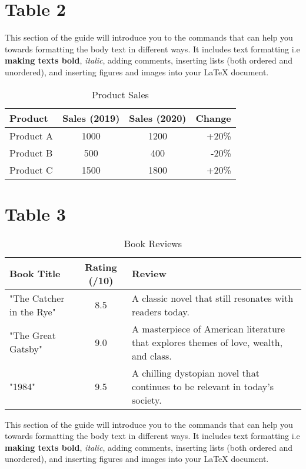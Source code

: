 \documentclass{article}
\begin{document}
\section{Table 2}
This section of the guide will introduce you to the commands that can help you towards formatting the body text in different ways. It includes text formatting i.e \textbf{making texts bold}, \textit{italic}, adding comments, inserting lists (both ordered and unordered), and inserting figures and images into your \LaTeX{} document.

\begin{table}[!htb]
\centering
\caption{Product Sales}
\label{tab:product_sales}
\begin{tabular}{|l|c|c|r|}
\hline
\textbf{Product} & \textbf{Sales (2019)} & \textbf{Sales (2020)} & \textbf{Change} \\
\hline
Product A & 1000 & 1200 & +20\% \\
\hline
Product B & 500 & 400 & -20\% \\
\hline
Product C & 1500 & 1800 & +20\% \\
\hline
\end{tabular}
\end{table}


\section{Table 3}
\begin{table}[ht]
\centering
\caption{Book Reviews}
\label{tab:book_reviews}
\begin{tabular}{|p{6cm}|c|p{6cm}|}
\hline
\textbf{Book Title} & \textbf{Rating (/10)} & \textbf{Review} \\
\hline
"The Catcher in the Rye" & 8.5 & A classic novel that still resonates with readers today. \\
\hline
"The Great Gatsby" & 9.0 & A masterpiece of American literature that explores themes of love, wealth, and class. \\
\hline
"1984" & 9.5 & A chilling dystopian novel that continues to be relevant in today's society. \\
\hline
\end{tabular}
\end{table}
This section of the guide will introduce you to the commands that can help you towards formatting the body text in different ways. It includes text formatting i.e \textbf{making texts bold}, \textit{italic}, adding comments, inserting lists (both ordered and unordered), and inserting figures and images into your \LaTeX{} document.


\listoffigures
\listoftables
\clearpage

\clearpage
\tableofcontents
\end{document}
